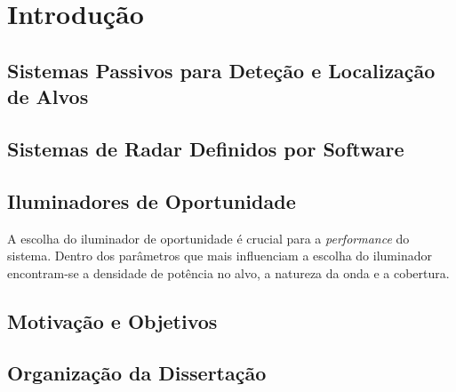 % 
\chapter{Introdução} %
\label{chap:Chapter1} %


%




\section{Sistemas Passivos para Deteção e Localização de Alvos}


\section{Sistemas de Radar Definidos por Software}


\section{Iluminadores de Oportunidade}
A escolha do iluminador de oportunidade é crucial para a \textit{performance} do sistema. Dentro dos parâmetros que mais influenciam a escolha do iluminador encontram-se a densidade de potência no alvo, a natureza da onda e a cobertura.

\section{Motivação e Objetivos}


\section{Organização da Dissertação}